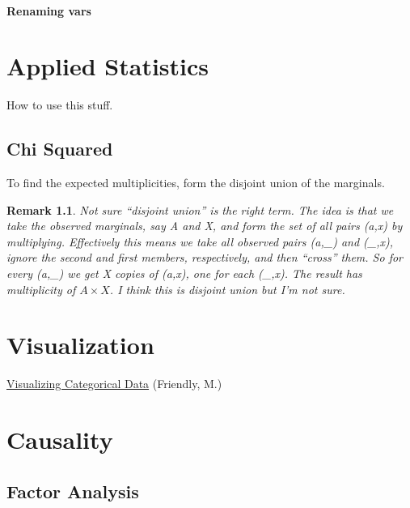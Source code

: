 \documentclass[reqno,12pt]{tufte-book}
\numberwithin{equation}{subsection}
\newtheorem{remark}{Remark}
\begin{document}
\subsection{Renaming vars}
\label{sub:renamingvars}


\part{Applied Statistics}

How to use this stuff.

\chapter{Chi Squared}
\label{sect:chisquared}

To find the expected multiplicities, form the disjoint union of the marginals.

\begin{remark}
  Not sure ``disjoint union'' is the right term.  The idea is that we
  take the observed marginals, say A and X, and form the set of all
  pairs (a,x) by multiplying.  Effectively this means we take all
  observed pairs (a,\_) and (\_,x), ignore the second and first
  members, respectively, and then ``cross'' them.  So for every (a,\_)
  we get X copies of (a,x), one for each (\_,x).  The result has
  multiplicity of \(A\times X\).  I think this is disjoint union but
  I'm not sure.
\end{remark}

\part{Visualization}

\href{http://www.datavis.ca/books/vcd/}{Visualizing Categorical Data} (Friendly, M.)

\part{Causality}

\chapter{Factor Analysis}
\end{document}
